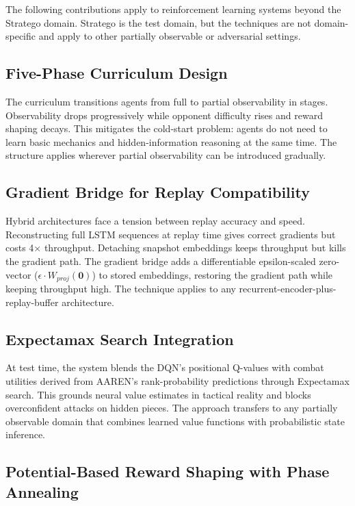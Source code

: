 The following contributions apply to reinforcement learning systems beyond the Stratego domain. Stratego is the test domain, but the techniques are not domain-specific and apply to other partially observable or adversarial settings.

\subsection{Five-Phase Curriculum Design}

The curriculum transitions agents from full to partial observability in stages. Observability drops progressively while opponent difficulty rises and reward shaping decays. This mitigates the cold-start problem: agents do not need to learn basic mechanics and hidden-information reasoning at the same time. The structure applies wherever partial observability can be introduced gradually.

\subsection{Gradient Bridge for Replay Compatibility}

Hybrid architectures face a tension between replay accuracy and speed. Reconstructing full LSTM sequences at replay time gives correct gradients but costs 4$\times$ throughput. Detaching snapshot embeddings keeps throughput but kills the gradient path. The gradient bridge adds a differentiable epsilon-scaled zero-vector ($\epsilon \cdot W_{proj}(\mathbf{0})$) to stored embeddings, restoring the gradient path while keeping throughput high. The technique applies to any recurrent-encoder-plus-replay-buffer architecture.

\subsection{Expectamax Search Integration}

At test time, the system blends the DQN's positional Q-values with combat utilities derived from AAREN's rank-probability predictions through Expectamax search. This grounds neural value estimates in tactical reality and blocks overconfident attacks on hidden pieces. The approach transfers to any partially observable domain that combines learned value functions with probabilistic state inference.

\subsection{Potential-Based Reward Shaping with Phase Annealing}

